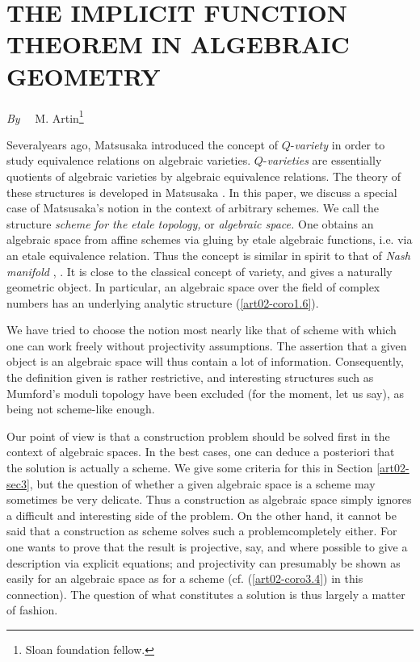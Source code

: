 \chapter[\textsc{M. Artin} : The Implicit Function Theorem in Algebraic Geometry]{THE IMPLICIT FUNCTION THEOREM IN ALGEBRAIC GEOMETRY}\label{art02}

\begin{center}
{\em By}~~ M. Artin\footnote{Sloan foundation fellow.}
\end{center}


\setcounter{pageoriginal}{12}
Several\pageoriginale years ago, Matsusaka introduced the concept of $Q$-{\em variety} in order to study equivalence relations on algebraic varieties. $Q$-{\em varieties} are essentially quotients of algebraic varieties by algebraic equivalence relations. The theory of these structures is developed in Matsusaka \cite{art02-key24}. In this paper, we discuss a special case of Matsusaka's notion in the context of arbitrary schemes. We call the structure {\em scheme for the etale topology,} or {\em algebraic space.} One obtains an algebraic space from affine schemes via gluing by etale algebraic functions, i.e. via an etale equivalence relation. Thus the concept is similar in spirit to that of {\em Nash manifold} \cite{art02-key29}, \cite{art02-key5}. It is close to the classical concept of variety, and gives a naturally geometric object. In particular, an algebraic space over the field of complex numbers has an underlying analytic structure (\ref{art02-coro1.6}).

We have tried to choose the notion most nearly like that of scheme with which one can work freely without projectivity assumptions. The assertion that a given object is an algebraic space will thus contain a lot of information. Consequently, the definition given is rather restrictive, and interesting structures such as Mumford's moduli topology \cite{art02-key26} have been excluded (for the moment, let us say), as being not scheme-like enough.

Our point of view is that a construction problem should be solved first in the context of algebraic spaces. In the best cases, one can deduce a posteriori that the solution is actually a scheme. We give some criteria for this in Section \ref{art02-sec3}, but the question of whether a given algebraic space is a scheme may sometimes be very delicate. Thus a construction as algebraic space simply ignores a difficult and interesting side of the problem. On the other hand, it cannot be said that a construction as scheme solves such a problem\pageoriginale completely either. For one wants to prove that the result is projective, say, and where possible to give a description via explicit equations; and projectivity can presumably be shown as easily for an algebraic space as for a scheme (cf. (\ref{art02-coro3.4}) in this connection). The question of what constitutes a solution is thus largely a matter of fashion.


